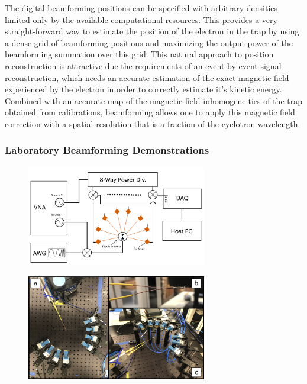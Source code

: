 The digital beamforming positions can be specified with arbitrary densities limited only by the available computational resources. This provides a very straight-forward way to estimate the position of the electron in the trap by using a dense grid of beamforming positions and maximizing the output power of the beamforming summation over this grid. This natural approach to position reconstruction is attractive due the requirements of an event-by-event signal reconstruction, which needs an accurate estimation of the exact magnetic field experienced by the electron in order to correctly estimate it's kinetic energy. Combined with an accurate map of the magnetic field inhomogeneities of the trap obtained from calibrations, beamforming allows one to apply this magnetic field correction with a spatial resolution that is a fraction of the cyclotron wavelength.

\subsubsection*{Laboratory Beamforming Demonstrations}

\begin{figure}[htbp]
    \centering
    \includegraphics*[width=0.7\textwidth]{figs/Chapter-4/230725_beamforming_setup_diagram.png}
    \caption{}
\end{figure}

\begin{figure}
    \centering
    \includegraphics*[width=0.7\textwidth]{figs/Chapter-4/230725_beamforming_demo_image.png}
    \caption{}
\end{figure}

